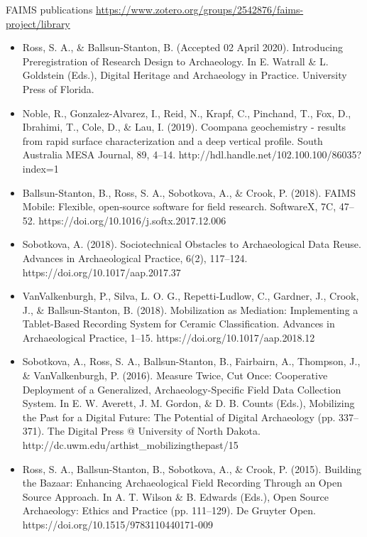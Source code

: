 \documentclass[aspectratio=169, 12pt]{beamer} %
\begin{document}
\begin{frame}[allowframebreaks]{FAIMS publications}
    \url{https://www.zotero.org/groups/2542876/faims-project/library}
        \begin{itemize}[label=\textbullet]
        \nocite{Ross2020-yg,Noble2019-qg,Ballsun-Stanton2018-zd,Sobotkova2018-al,VanValkenburgh2018-hv,Sobotkova2016-mx,Ross2015-ph,Sobotkova2015-lq,Ross2013-hi}
            \item Ross, S. A., \& Ballsun-Stanton, B. (Accepted 02 April 2020). Introducing Preregistration of Research Design to Archaeology. In E. Watrall \& L. Goldstein (Eds.), Digital Heritage and Archaeology in Practice. University Press of Florida.
            \item Noble, R., Gonzalez-Alvarez, I., Reid, N., Krapf, C., Pinchand, T., Fox, D., Ibrahimi, T., Cole, D., \& Lau, I. (2019). Coompana geochemistry - results from rapid surface characterization and a deep vertical profile. South Australia MESA Journal, 89, 4–14. http://hdl.handle.net/102.100.100/86035?index=1
            \item Ballsun-Stanton, B., Ross, S. A., Sobotkova, A., \& Crook, P. (2018). FAIMS Mobile: Flexible, open-source software for field research. SoftwareX, 7C, 47–52. https://doi.org/10.1016/j.softx.2017.12.006
            \item Sobotkova, A. (2018). Sociotechnical Obstacles to Archaeological Data Reuse. Advances in Archaeological Practice, 6(2), 117–124. https://doi.org/10.1017/aap.2017.37
            \item VanValkenburgh, P., Silva, L. O. G., Repetti-Ludlow, C., Gardner, J., Crook, J., \& Ballsun-Stanton, B. (2018). Mobilization as Mediation: Implementing a Tablet-Based Recording System for Ceramic Classification. Advances in Archaeological Practice, 1–15. https://doi.org/10.1017/aap.2018.12
            \item Sobotkova, A., Ross, S. A., Ballsun-Stanton, B., Fairbairn, A., Thompson, J., \& VanValkenburgh, P. (2016). Measure Twice, Cut Once: Cooperative Deployment of a Generalized, Archaeology-Specific Field Data Collection System. In E. W. Averett, J. M. Gordon, \& D. B. Counts (Eds.), Mobilizing the Past for a Digital Future: The Potential of Digital Archaeology (pp. 337–371). The Digital Press @ University of North Dakota. http://dc.uwm.edu/arthist\_mobilizingthepast/15 
            \item Ross, S. A., Ballsun-Stanton, B., Sobotkova, A., \& Crook, P. (2015). Building the Bazaar: Enhancing Archaeological Field Recording Through an Open Source Approach. In A. T. Wilson \& B. Edwards (Eds.), Open Source Archaeology: Ethics and Practice (pp. 111–129). De Gruyter Open. https://doi.org/10.1515/9783110440171-009

\end{itemize}
\end{frame}
\end{document}
